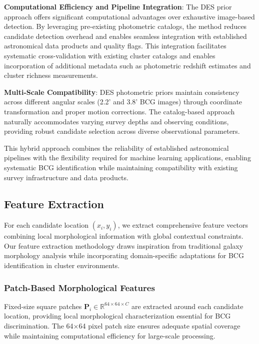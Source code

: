 \documentclass[twocolumn,10pt]{aastex631}
\begin{document}
\textbf{Computational Efficiency and Pipeline Integration}: The DES prior approach offers significant computational advantages over exhaustive image-based detection. By leveraging pre-existing photometric catalogs, the method reduces candidate detection overhead and enables seamless integration with established astronomical data products and quality flags. This integration facilitates systematic cross-validation with existing cluster catalogs and enables incorporation of additional metadata such as photometric redshift estimates and cluster richness measurements.

\textbf{Multi-Scale Compatibility}: DES photometric priors maintain consistency across different angular scales (2.2' and 3.8' BCG images) through coordinate transformation and proper motion corrections. The catalog-based approach naturally accommodates varying survey depths and observing conditions, providing robust candidate selection across diverse observational parameters.

This hybrid approach combines the reliability of established astronomical pipelines with the flexibility required for machine learning applications, enabling systematic BCG identification while maintaining compatibility with existing survey infrastructure and data products.

\subsection{Feature Extraction}

For each candidate location $(x_i, y_i)$, we extract comprehensive feature vectors combining local morphological information with global contextual constraints. Our feature extraction methodology draws inspiration from traditional galaxy morphology analysis \citep{Conselice2003} while incorporating domain-specific adaptations for BCG identification in cluster environments.

\subsubsection{Patch-Based Morphological Features}

Fixed-size square patches $\mathbf{P}_i \in \mathbb{R}^{64 \times 64 \times C}$ are extracted around each candidate location, providing local morphological characterization essential for BCG discrimination. The 64×64 pixel patch size ensures adequate spatial coverage while maintaining computational efficiency for large-scale processing.
\end{document}
